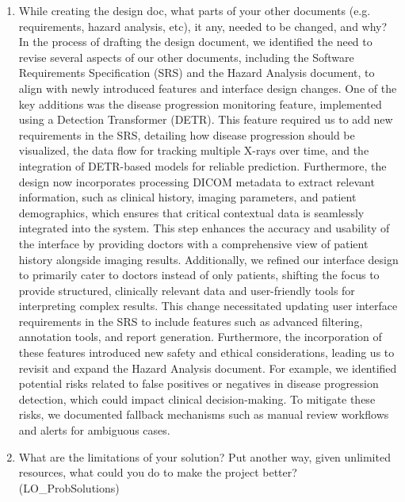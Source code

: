 \documentclass[12pt, titlepage]{article}
\begin{document}
\begin{enumerate}
  \item While creating the design doc, what parts of your other documents (e.g.
  requirements, hazard analysis, etc), it any, needed to be changed, and why?
  \newline\newline
  In the process of drafting the design document, we identified the need to revise several aspects of our other documents, including the Software Requirements Specification (SRS) and the Hazard Analysis document, to align with newly introduced features and interface design changes. One of the key additions was the disease progression monitoring feature, implemented using a Detection Transformer (DETR). This feature required us to add new requirements in the SRS, detailing how disease progression should be visualized, the data flow for tracking multiple X-rays over time, and the integration of DETR-based models for reliable prediction. Furthermore, the design now incorporates processing DICOM metadata to extract relevant information, such as clinical history, imaging parameters, and patient demographics, which ensures that critical contextual data is seamlessly integrated into the system. This step enhances the accuracy and usability of the interface by providing doctors with a comprehensive view of patient history alongside imaging results. Additionally, we refined our interface design to primarily cater to doctors instead of only patients, shifting the focus to provide structured, clinically relevant data and user-friendly tools for interpreting complex results. This change necessitated updating user interface requirements in the SRS to include features such as advanced filtering, annotation tools, and report generation. Furthermore, the incorporation of these features introduced new safety and ethical considerations, leading us to revisit and expand the Hazard Analysis document. For example, we identified potential risks related to false positives or negatives in disease progression detection, which could impact clinical decision-making. To mitigate these risks, we documented fallback mechanisms such as manual review workflows and alerts for ambiguous cases.  
  \item What are the limitations of your solution?  Put another way, given unlimited resources, what could you do to make the project better? (LO\_ProbSolutions)
  \newline\newline

\end{enumerate}
\end{document}
